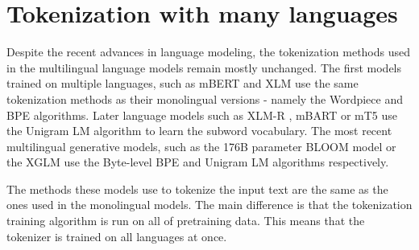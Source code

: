 



\section{Tokenization with many languages}

Despite the recent advances in language modeling, the tokenization methods used in the multilingual language models remain mostly unchanged. The first models trained on multiple languages, such as mBERT \cite{devlin_bert_2019} and XLM \cite{lample_cross-lingual_2019} use the same tokenization methods as their monolingual versions - namely the Wordpiece and BPE algorithms. Later language models such as XLM-R \cite{conneau_unsupervised_2020}, mBART \cite{liu_multilingual_2020} or mT5 \cite{xue_mt5_2021} use the Unigram LM algorithm to learn the subword vocabulary. The most recent multilingual generative models, such as the 176B parameter BLOOM model \cite{scao_bloom_2022} or the XGLM \cite{lin_few-shot_2022} use the Byte-level BPE and Unigram LM algorithms respectively.




The methods these models use to tokenize the input text are the same as the ones used in the monolingual models. The main difference is that the tokenization training algorithm is run on all of pretraining data. This means that the tokenizer is trained on all languages at once. 

